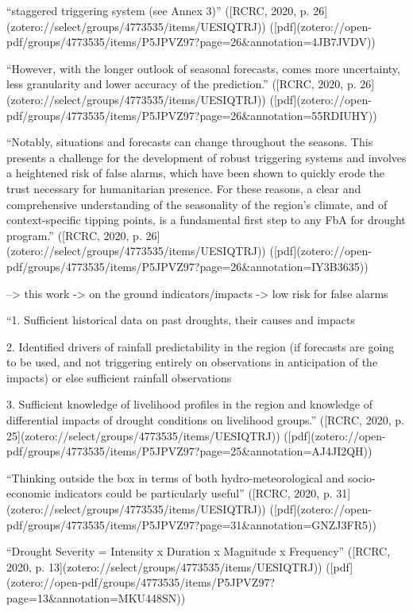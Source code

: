 {%
“staggered triggering system (see Annex 3)” ([RCRC, 2020, p. 26](zotero://select/groups/4773535/items/UESIQTRJ)) ([pdf](zotero://open-pdf/groups/4773535/items/P5JPVZ97?page=26&annotation=4JB7JVDV))

“However, with the longer outlook of seasonal forecasts, comes more uncertainty, less granularity and lower accuracy of the prediction.” ([RCRC, 2020, p. 26](zotero://select/groups/4773535/items/UESIQTRJ)) ([pdf](zotero://open-pdf/groups/4773535/items/P5JPVZ97?page=26&annotation=55RDIUHY))

“Notably, situations and forecasts can change throughout the seasons. This presents a challenge for the development of robust triggering systems and involves a heightened risk of false alarms, which have been shown to quickly erode the trust necessary for humanitarian presence. For these reasons, a clear and comprehensive understanding of the seasonality of the region’s climate, and of context-specific tipping points, is a fundamental first step to any FbA for drought program.” ([RCRC, 2020, p. 26](zotero://select/groups/4773535/items/UESIQTRJ)) ([pdf](zotero://open-pdf/groups/4773535/items/P5JPVZ97?page=26&annotation=IY3B3635))

--> this work -> on the ground indicators/impacts -> low risk for false alarms

“1. Sufficient historical data on past droughts, their causes and impacts 

2. Identified drivers of rainfall predictability in the region (if forecasts are going to be used, and not triggering entirely on observations in anticipation of the impacts) or else sufficient rainfall observations 

3. Sufficient knowledge of livelihood profiles in the region and knowledge of differential impacts of drought conditions on livelihood groups.” ([RCRC, 2020, p. 25](zotero://select/groups/4773535/items/UESIQTRJ)) ([pdf](zotero://open-pdf/groups/4773535/items/P5JPVZ97?page=25&annotation=AJ4JI2QH))




“Thinking outside the box in terms of both hydro-meteorological and socio-economic indicators could be particularly useful” ([RCRC, 2020, p. 31](zotero://select/groups/4773535/items/UESIQTRJ)) ([pdf](zotero://open-pdf/groups/4773535/items/P5JPVZ97?page=31&annotation=GNZJ3FR5))


“Drought Severity = Intensity x Duration x Magnitude x Frequency” ([RCRC, 2020, p. 13](zotero://select/groups/4773535/items/UESIQTRJ)) ([pdf](zotero://open-pdf/groups/4773535/items/P5JPVZ97?page=13&annotation=MKU448SN))


}
